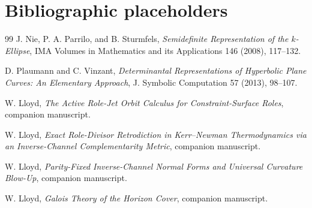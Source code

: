 \documentclass[11pt]{article}
\theoremstyle{remark}
\begin{document}
\section{Bibliographic placeholders}

\begin{thebibliography}{99}
J. Nie, P. A. Parrilo, and B. Sturmfels,
\emph{Semidefinite Representation of the $k$-Ellipse},
IMA Volumes in Mathematics and its Applications 146 (2008), 117--132.

D. Plaumann and C. Vinzant,
\emph{Determinantal Representations of Hyperbolic Plane Curves:
An Elementary Approach},
J. Symbolic Computation 57 (2013), 98--107.

W. Lloyd,
\emph{The Active Role-Jet Orbit Calculus for Constraint-Surface Roles},
companion manuscript.

W. Lloyd,
\emph{Exact Role-Divisor Retrodiction in Kerr--Newman Thermodynamics
via an Inverse-Channel Complementarity Metric},
companion manuscript.

W. Lloyd,
\emph{Parity-Fixed Inverse-Channel Normal Forms and Universal Curvature
Blow-Up},
companion manuscript.

W. Lloyd,
\emph{Galois Theory of the Horizon Cover},
companion manuscript.
\end{thebibliography}
\end{document}
